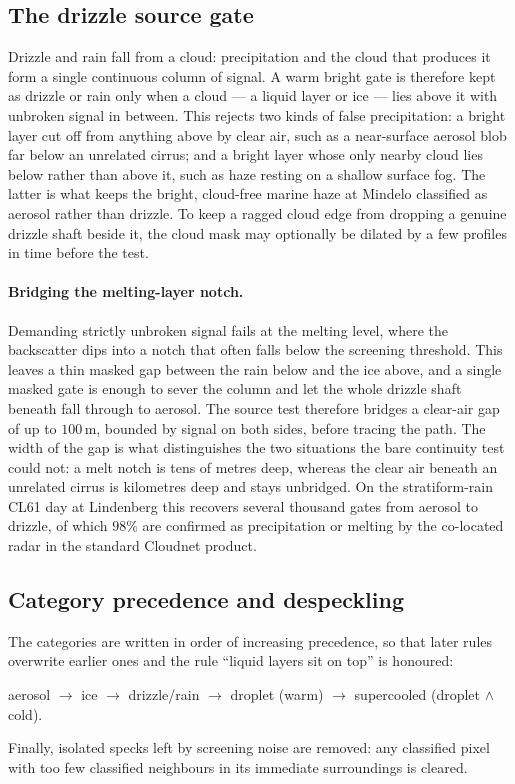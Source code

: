 \documentclass[11pt,a4paper]{article}
\begin{document}
\subsection{The drizzle source gate}
\label{sec:source}

Drizzle and rain fall from a cloud: precipitation and the cloud that produces it
form a single continuous column of signal. A warm bright gate is therefore kept as
drizzle or rain only when a cloud --- a liquid layer or ice --- lies above it with
unbroken signal in between. This rejects two kinds of false precipitation: a bright
layer cut off from anything above by clear air, such as a near-surface aerosol blob
far below an unrelated cirrus; and a bright layer whose only nearby cloud lies
below rather than above it, such as haze resting on a shallow surface fog. The
latter is what keeps the bright, cloud-free marine haze at Mindelo classified as
aerosol rather than drizzle. To keep a ragged cloud edge from dropping a genuine
drizzle shaft beside it, the cloud mask may optionally be dilated by a few profiles
in time before the test.

\paragraph{Bridging the melting-layer notch.}
Demanding strictly unbroken signal fails at the melting level, where the
backscatter dips into a notch that often falls below the screening threshold. This
leaves a thin masked gap between the rain below and the ice above, and a single
masked gate is enough to sever the column and let the whole drizzle shaft beneath
fall through to aerosol. The source test therefore bridges a clear-air gap of up to
$100\,\mathrm{m}$, bounded by signal on both sides, before tracing the path. The
width of the gap is what distinguishes the two situations the bare continuity test
could not: a melt notch is tens of metres deep, whereas the clear air beneath an
unrelated cirrus is kilometres deep and stays unbridged. On the stratiform-rain
CL61 day at Lindenberg this recovers several thousand gates from aerosol to
drizzle, of which $98\%$ are confirmed as precipitation or melting by the
co-located radar in the standard Cloudnet product.

\subsection{Category precedence and despeckling}
\label{sec:assemble}

The categories are written in order of increasing precedence, so that later rules
overwrite earlier ones and the rule ``liquid layers sit on top'' is honoured:
%
\begin{center}
\small
aerosol $\rightarrow$ ice $\rightarrow$ drizzle/rain $\rightarrow$
droplet (warm) $\rightarrow$ supercooled (droplet $\wedge$ cold).
\end{center}
%
Finally, isolated specks left by screening noise are removed: any classified pixel
with too few classified neighbours in its immediate surroundings is cleared.
\end{document}
